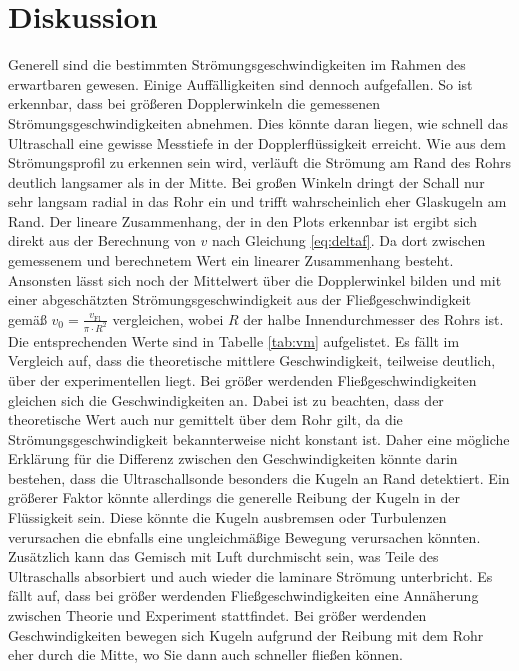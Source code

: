 \section{Diskussion}
Generell sind die bestimmten Strömungsgeschwindigkeiten im Rahmen des erwartbaren gewesen. Einige Auffälligkeiten sind dennoch aufgefallen.
So ist erkennbar, dass bei größeren Dopplerwinkeln die gemessenen Strömungsgeschwindigkeiten abnehmen. Dies könnte daran liegen, wie schnell das Ultraschall 
eine gewisse Messtiefe in der Dopplerflüssigkeit erreicht. Wie aus dem Strömungsprofil zu erkennen sein wird, verläuft die Strömung am Rand des Rohrs deutlich langsamer als in der Mitte.
Bei großen Winkeln dringt der Schall nur sehr langsam radial in das Rohr ein und trifft wahrscheinlich eher Glaskugeln am Rand.
Der lineare Zusammenhang, der in den Plots erkennbar ist ergibt sich direkt aus der Berechnung von $v$ nach Gleichung \eqref{eq:deltaf}. Da dort zwischen gemessenem und
berechnetem Wert ein linearer Zusammenhang besteht.
Ansonsten lässt sich noch der Mittelwert über die Dopplerwinkel bilden und mit einer abgeschätzten Strömungsgeschwindigkeit aus 
der Fließgeschwindigkeit gemäß $v_0=\frac{v_{\text{Fl}}}{\pi \cdot R^2}$ vergleichen, wobei $R$ der halbe Innendurchmesser des Rohrs ist.
Die entsprechenden Werte sind in Tabelle \ref{tab:vm} aufgelistet. Es fällt im Vergleich auf, dass die theoretische mittlere Geschwindigkeit, teilweise deutlich, über der experimentellen liegt.
Bei größer werdenden Fließgeschwindigkeiten gleichen sich die Geschwindigkeiten an. Dabei ist zu beachten, dass der theoretische Wert auch nur gemittelt über dem Rohr gilt, da die Strömungsgeschwindigkeit bekannterweise
nicht konstant ist. Daher eine mögliche Erklärung für die Differenz zwischen den Geschwindigkeiten könnte darin bestehen, dass die Ultraschallsonde besonders die Kugeln an Rand detektiert. Ein größerer Faktor könnte allerdings die
generelle Reibung der Kugeln in der Flüssigkeit sein. Diese könnte die Kugeln ausbremsen oder Turbulenzen verursachen die ebnfalls eine ungleichmäßige Bewegung verursachen könnten.
Zusätzlich kann das Gemisch mit Luft durchmischt sein, was Teile des Ultraschalls absorbiert und auch wieder die laminare Strömung unterbricht.
Es fällt auf, dass bei größer werdenden Fließgeschwindigkeiten eine Annäherung zwischen Theorie und Experiment stattfindet. Bei größer werdenden
Geschwindigkeiten bewegen sich Kugeln aufgrund der Reibung mit dem Rohr eher durch die Mitte, wo Sie dann auch schneller fließen können.
